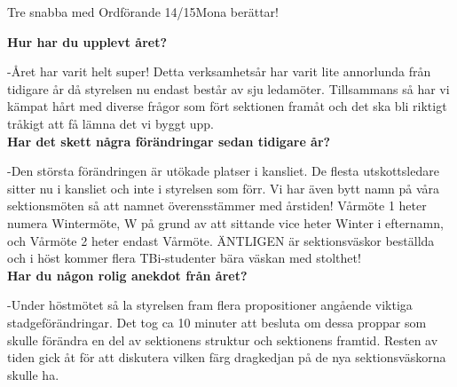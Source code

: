 \begin{news}{2}{Tre snabba med Ordförande 14/15}{Mona berättar!}{}{}


  \noindent \textbf{Hur har du upplevt året?}  
  
  -Året har varit helt super! Detta
  verksamhetsår har varit lite annorlunda från tidigare år då
  styrelsen nu endast består av sju ledamöter. Tillsammans så har vi
  kämpat hårt med diverse frågor som fört sektionen framåt och det ska
  bli riktigt tråkigt att få lämna det vi byggt upp.\\

  \noindent \textbf{Har det skett några förändringar sedan tidigare år?}  
  
  -Den
  största förändringen är utökade platser i kansliet. De flesta
  utskottsledare sitter nu i kansliet och inte i styrelsen som
  förr. Vi har även bytt namn på våra sektionsmöten så att namnet
  överensstämmer med årstiden!  Vårmöte 1 heter numera Wintermöte, W
  på grund av att sittande vice heter Winter i efternamn, och Vårmöte
  2 heter endast Vårmöte. ÄNTLIGEN är sektionsväskor beställda och i
  höst kommer flera TBi-studenter bära väskan med stolthet!\\

  \noindent \textbf{Har du någon rolig anekdot från året?}  
  
  -Under höstmötet så
  la styrelsen fram flera propositioner angående viktiga
  stadgeförändringar. Det tog ca 10 minuter att besluta om dessa
  proppar som skulle förändra en del av sektionens struktur och
  sektionens framtid. Resten av tiden gick åt för att diskutera vilken
  färg dragkedjan på de nya sektionsväskorna skulle ha.




\end{news}
